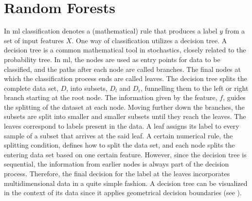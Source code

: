 \section{Random Forests}\label{sec:randomforestbackground}
In \ac{ml} classification denotes a (mathematical) rule that produces a label $y$ from a set of input features $X$. One way of classification utilizes a decision tree. A decision tree is a common mathematical tool in stochastics, closely related to the probability tree. In \ac{ml}, the nodes are used as entry points for data to be classified, and the paths after each node are called branches. The final nodes at which the classification process ends are called leaves. The decision tree splits the complete data set, $D$, into subsets, $D_{l}$ and $D_\text{r}$, funnelling them to the left or right branch starting at the root node. The information given by the feature, $f$, guides the splitting of the dataset at each node. Moving further down the branches, the subsets are split into smaller and smaller subsets until they reach the leaves. The leaves correspond to labels present in the data. A leaf assigns its label to every sample of a subset that arrives at the said leaf. A certain numerical rule, the splitting condition, defines how to split the data set, and each node splits the entering data set based on one certain feature. However, since the decision tree is sequential, the information from earlier nodes is always part of the decision process. Therefore, the final decision for the label at the leaves incorporates multidimensional data in a quite simple fashion. A decision tree can be visualized in the context of its data since it applies geometrical decision boundaries (see ).\cite{Forsyth2019}
